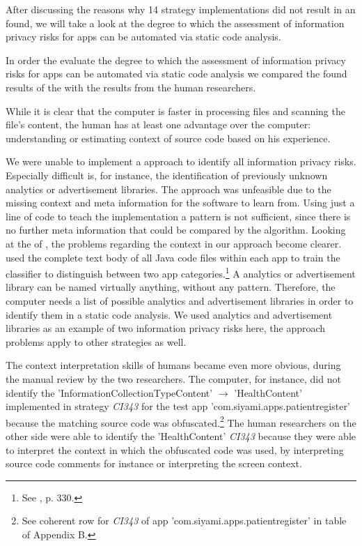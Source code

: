 After discussing the reasons why 14 strategy implementations did not result in an \ipr found, we will take a look at the degree to which the assessment of information privacy risks for \mH apps can be automated via static code analysis.

In order the evaluate the degree to which the assessment of information privacy risks for \mH apps can be automated via static code analysis we compared the \ipr found results of the \aiprat with the results from the human researchers.

While it is clear that the computer is faster in processing files and scanning the file's content, the human has at least one advantage over the computer: understanding or estimating context of source code based on his experience.

We were unable to implement a \ml approach to identify all information privacy risks.
Especially difficult is, for instance, the identification of previously unknown analytics or advertisement libraries.
The \ml approach was unfeasible due to the missing context and meta information for the software to learn from.
Using just a line of code to teach the \ml implementation a pattern is not sufficient, since there is no further meta information that could be compared by the algorithm.
Looking at the \ml of \textcite{Shabtai2010}, the problems regarding the context in our approach become clearer.
\textcite{Shabtai2010} used the complete text body of all Java code files within each app to train the \ml classifier to distinguish between two app categories.\footnote{See \cite{Shabtai2010}, p. 330.}
A analytics or advertisement library can be named virtually anything, without any pattern.
Therefore, the computer needs a list of possible analytics and advertisement libraries in order to identify them in a static code analysis.
We used analytics and advertisement libraries as an example of two information privacy risks here, the \ml approach problems apply to other \ipr strategies as well.

The context interpretation skills of humans became even more obvious, during the manual review by the two researchers.
The computer, for instance, did not identify the \ipr 'InformationCollectionTypeContent' $\rightarrow$ 'HealthContent' implemented in strategy \textit{CI343} for the test app 'com.siyami.apps.patientregister' because the matching source code was obfuscated.\footnote{See coherent row for \textit{CI343} of app 'com.siyami.apps.patientregister'  in table of Appendix B.}
The human researchers on the other side were able to identify the 'HealthContent' \textit{CI343} \ipr because they were able to interpret the context in which the obfuscated code was used, by interpreting source code comments for instance or interpreting the screen context.

